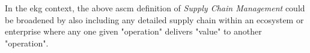 %
%

\ekgmmContextSection

In the \gls{ekg} context, the above \gls{ascm} definition of \textit{Supply Chain Management} could be broadened
by also including any detailed supply chain within an ecosystem or enterprise where any one given "operation"
delivers "value" to another "operation".

